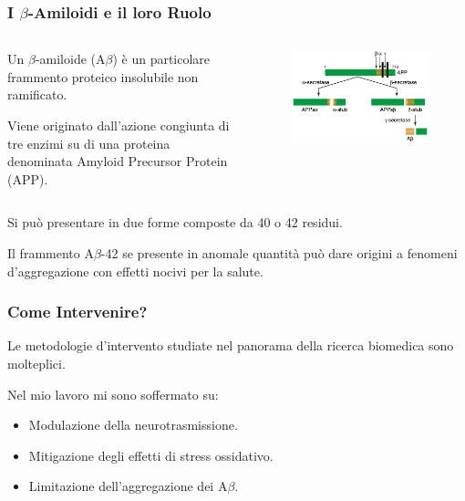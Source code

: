 \documentclass[9pt]{beamer}
\begin{document}
\begin{frame}
	\frametitle{I $\beta$-Amiloidi e il loro Ruolo}
	\bigskip
	\begin{columns}
		\begin{column}{0.5\textwidth}
			Un $\beta$-amiloide (A$\beta$) è un particolare frammento proteico insolubile non ramificato.
			
			\smallskip
			Viene originato dall'azione congiunta di tre enzimi su di una proteina denominata Amyloid Precursor Protein (APP).
		\end{column}
		\begin{column}{0.5\textwidth}
			
			\begin{figure}
				\includegraphics[width=\textwidth]{immagini/APP.png}
			\end{figure}
		\end{column}
	\end{columns}
	
	\medskip
	Si può presentare in due forme composte da 40 o 42 residui.
	
	Il frammento A$\beta$-42 se presente in anomale quantità può dare origini a fenomeni d'aggregazione con effetti nocivi per la salute.
	
\end{frame}

\begin{frame}
	\frametitle{Come Intervenire?}
	Le metodologie d'intervento studiate nel panorama della ricerca biomedica sono molteplici.
	
	Nel mio lavoro mi sono soffermato su:
	\begin{itemize}
		\item Modulazione della neurotrasmissione.
		\item Mitigazione degli effetti di stress ossidativo.
		\item Limitazione dell'aggregazione dei A$\beta$.
	\end{itemize}
	
	
	
\end{frame}
\end{document}
